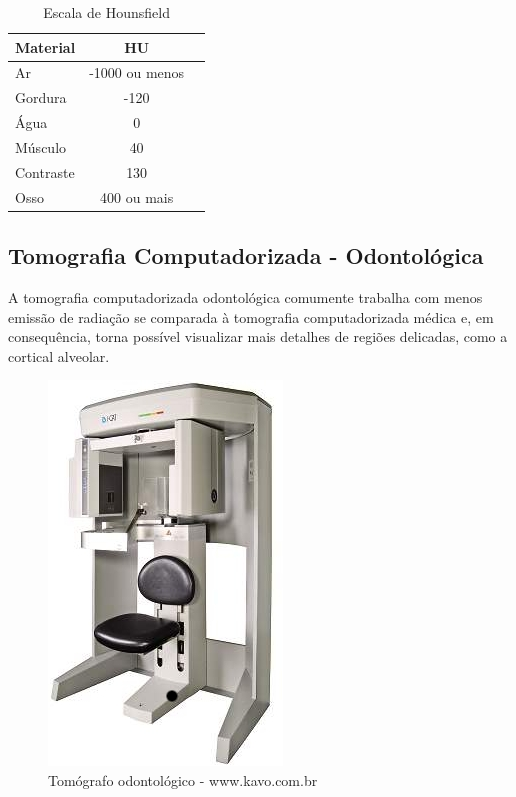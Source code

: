 \begin{table}[h]
\centering
\caption{Escala de Hounsfield}
\begin{tabular}{lcc}\\
\hline %
Material & HU\\
\hline
\hline
Ar & -1000 ou menos\\
Gordura & -120\\
Água & 0\\
Músculo & 40\\
Contraste & 130\\
Osso & 400 ou mais\\
\hline
\end{tabular}
\label{tab:escala_hounsfield}
\end{table}


\subsection{Tomografia Computadorizada - Odontológica}

A tomografia computadorizada odontológica comumente trabalha com menos emissão
de radiação se comparada à tomografia computadorizada médica e, em consequência,
torna possível visualizar mais detalhes de regiões delicadas, como a cortical alveolar.

\begin{figure}[!htb]
\centering
\includegraphics[scale=0.4]{../user_guide_figures/feixe_conico.jpg}
\caption{Tomógrafo odontológico - www.kavo.com.br}
\end{figure}

